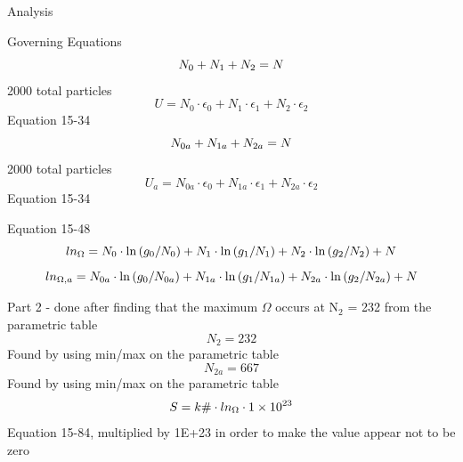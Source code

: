 \documentclass[10pt,fleqn]{article}
\newcommand{\V}[1]{\mbox{$ #1 $}}
\begin{document}
\vspace{0.10in}
\noindent
{\color{blue} \rm Analysis}

\vspace{0.10in}
\noindent
{\color{blue} \rm Governing Equations}
\begin{equation}
\label{EES Eqn:10}
N_{0} + N_{1} + N_{2} = \V{N	}  
\end{equation}
{\color{blue} \rm 2000 total particles}
\begin{equation}
\label{EES Eqn:11}
U = N_{0} \cdot  \epsilon_{0} + N_{1} \cdot  \epsilon_{1} + N_{2} \cdot  \epsilon_{2	} 
\end{equation}
{\color{blue} \rm Equation 15-34}
\begin{equation}
\label{EES Eqn:12}
N_{0a} + N_{1a} + N_{2a} = \V{N	}  
\end{equation}
{\color{blue} \rm 2000 total particles}
\begin{equation}
\label{EES Eqn:13}
U_{a} = N_{0a} \cdot  \epsilon_{0} + N_{1a} \cdot  \epsilon_{1} + N_{2a} \cdot  \epsilon_{2	} 
\end{equation}
{\color{blue} \rm Equation 15-34}

\vspace{0.10in}
\noindent
{\color{blue} \rm Equation 15-48}
\begin{equation}
\label{EES Eqn:14}
\V{ln} _{\Omega} = N_{0}\cdot \ln{ \left( g_{0}/N_{0} \right) } + N_{1}\cdot \ln{ \left( g_{1}/N_{1} \right) } + N_{2}\cdot \ln{ \left( g_{2}/N_{2} \right) } + N 
\end{equation}
\begin{equation}
\label{EES Eqn:15}
\V{ln} _{\Omega,a} = N_{0a}\cdot \ln{ \left( g_{0}/N_{0a} \right) } + N_{1a}\cdot \ln{ \left( g_{1}/N_{1a} \right) } + N_{2a}\cdot \ln{ \left( g_{2}/N_{2a} \right) } + N 
\end{equation}

\vspace{0.10in}
\noindent
{\color{blue} \rm Part 2 - done after finding that the maximum $\Omega$ occurs at N$_{2}$ = 232 from the parametric table}
\begin{equation}
\label{EES Eqn:16}
N_{2} = 232	 
\end{equation}
{\color{blue} \rm Found by using min/max on the parametric table}
\begin{equation}
\label{EES Eqn:17}
N_{2a} = 667	 
\end{equation}
{\color{blue} \rm Found by using min/max on the parametric table}
\begin{equation}
\label{EES Eqn:18}
S = k\# \cdot  \V{ln} _{\Omega} \cdot  1\times 10^{23}	 
\end{equation}
{\color{blue} \rm Equation 15-84, multiplied by 1E+23 in order to make the value appear not to be zero}
\end{document}
